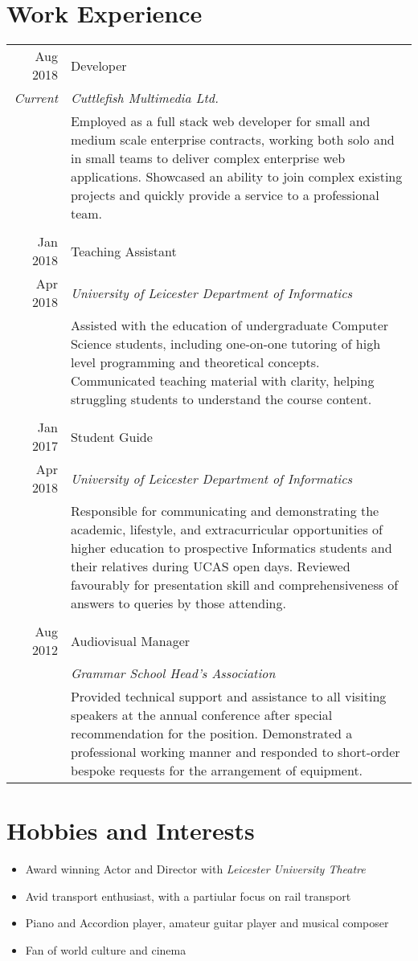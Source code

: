 \documentclass[a4paper]{article}
\begin{document}
\section*{Work Experience}
\begin{tabular}{r|p{11.75cm}}
  Aug 2018 & Developer \\
  \emph{Current} & \emph{Cuttlefish Multimedia Ltd.} \\
  & Employed as a full stack web developer for small and medium scale enterprise contracts, working both solo and in small teams to deliver complex enterprise web applications. Showcased an ability to join complex existing projects and quickly provide a service to a professional team. \\
  \multicolumn{2}{c}{} \\
  
  Jan 2018 & Teaching Assistant \\
  Apr 2018 & \emph{University of Leicester Department of Informatics} \\
  & Assisted with the education of undergraduate Computer Science students, including one-on-one tutoring of high level programming and theoretical concepts. Communicated teaching material with clarity, helping struggling students to understand the course content. \\
  \multicolumn{2}{c}{} \\
  
  Jan 2017 & Student Guide \\
  Apr 2018 & \emph{University of Leicester Department of Informatics} \\
  & Responsible for communicating and demonstrating the academic, lifestyle, and extracurricular opportunities of higher education to prospective Informatics students and their relatives during UCAS open days. Reviewed favourably for presentation skill and comprehensiveness of answers to queries by those attending. \\
  \multicolumn{2}{c}{} \\

  Aug 2012 & Audiovisual Manager \\
  & \emph{Grammar School Head's Association} \\
  & Provided technical support and assistance to all visiting speakers at the annual conference after special recommendation for the position. Demonstrated a professional working manner and responded to short-order bespoke requests for the arrangement of equipment.
\end{tabular}

\section*{Hobbies and Interests}
\begin{itemize}
\item Award winning Actor and Director with \emph{Leicester University Theatre}
\item Avid transport enthusiast, with a partiular focus on rail transport
\item Piano and Accordion player, amateur guitar player and musical composer
\item Fan of world culture and cinema
\end{itemize}
\end{document}
